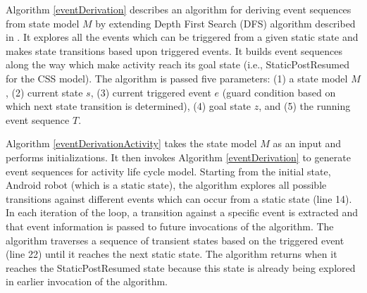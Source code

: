 \documentclass[10pt]{elsarticle}
\newlength{\algorithmwidth}
\begin{document}
Algorithm \ref{eventDerivation} describes an algorithm for deriving event sequences from state model $M$ by extending Depth First Search (DFS) algorithm described in \cite{Cormen}. It explores all the events which can be triggered from a given static state and makes state transitions based upon triggered events. It builds event sequences along the way which make activity reach its goal state (i.e., StaticPostResumed for the CSS model). The algorithm is passed five parameters: (1) a state model $M$, (2) current state $s$, (3) current triggered event $e$ (guard condition based on which next state transition is determined), (4) goal state $z$, and (5) the running event sequence $T$. 

Algorithm \ref{eventDerivationActivity} takes the state model $M$ as an input and performs initializations. It then invokes Algorithm \ref{eventDerivation} to generate event sequences for activity life cycle model. Starting from the initial state, Android robot (which is a static state), the algorithm explores all possible transitions against different events which can occur from a static state (line 14). In each iteration of the loop, a transition against a specific event is extracted and that event information is passed to future invocations of the algorithm. The algorithm traverses a sequence of transient states based on the triggered event (line 22) until it reaches the next static state. The algorithm returns when it reaches the StaticPostResumed state because this state is already being explored in earlier invocation of the algorithm.


\setlength{\algorithmwidth}{.95\textwidth}
\end{document}
